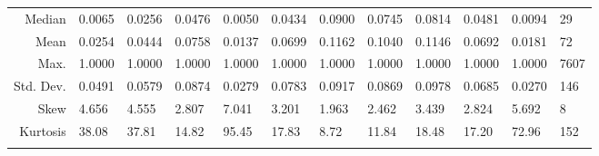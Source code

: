 \documentclass[11pt, a4paper]{article}
\begin{document}
\begin{table}[H]
{\begin{tabular}{|r|llllllllll!{\color{gray!50}\vrule}l|}
  Median & 0.0065 & 0.0256 & 0.0476 & 0.0050 & 0.0434 & 0.0900 & 0.0745 & 0.0814 & 0.0481 & 0.0094 &   29 \\ 
  Mean & 0.0254 & 0.0444 & 0.0758 & 0.0137 & 0.0699 & 0.1162 & 0.1040 & 0.1146 & 0.0692 & 0.0181 &   72 \\ 
  Max. & 1.0000 & 1.0000 & 1.0000 & 1.0000 & 1.0000 & 1.0000 & 1.0000 & 1.0000 & 1.0000 & 1.0000 & 7607 \\ 
  Std. Dev. & 0.0491 & 0.0579 & 0.0874 & 0.0279 & 0.0783 & 0.0917 & 0.0869 & 0.0978 & 0.0685 & 0.0270 &  146 \\ 
  Skew & 4.656 & 4.555 & 2.807 & 7.041 & 3.201 & 1.963 & 2.462 & 3.439 & 2.824 & 5.692 &    8 \\ 
  Kurtosis & 38.08 & 37.81 & 14.82 & 95.45 & 17.83 & 8.72 & 11.84 & 18.48 & 17.20 & 72.96 &  152 \\ 
\hline
\end{tabular}}
\end{table}
\end{document}
